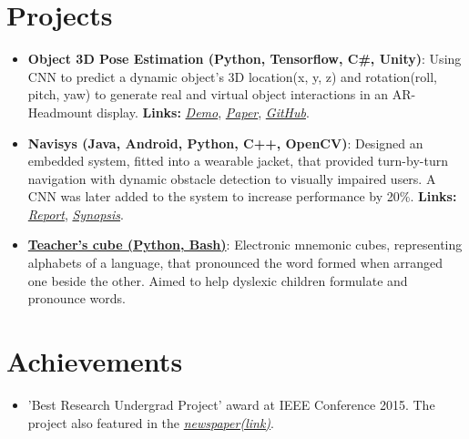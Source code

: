 \documentclass[letterpaper,11pt]{article}
\newcommand{\resumeItem}[2]{
  \linespread{1.2}
  \item\small{
      \textbf{#1}{: #2}
    }
}
\newcommand{\resumePoint}[1]{
  \linespread{1.2}
  \item\small{#1}
}
\newcommand{\resumeSubItem}[2]{\resumeItem{#1}{#2}\vspace{-4pt}}
\newcommand{\resumeSubHeadingListStart}{\begin{itemize}[leftmargin=*]}
\newcommand{\resumeSubHeadingListEnd}{\end{itemize}\vspace{-14pt}}
\begin{document}
%

\section{Projects}
  \resumeSubHeadingListStart
    \resumeSubItem{Object 3D Pose Estimation (Python, Tensorflow, C\#, Unity)}
      {Using CNN to predict a dynamic object\rq s 3D location(x, y, z) and rotation(roll, pitch, yaw) to generate real and virtual object interactions in an AR-Headmount display. \textbf{Links:}
      \href{https://drive.google.com/file/d/1kCepKQxR73tUTLuvmd1YL3sIbj1GxDdc/view?usp=sharing}{\textit{Demo}}, \href{https://drive.google.com/file/d/1mRwSJ8p2-g-gtBGl1A8seRB8SojWQphm/view?usp=sharing}{\textit{Paper}}, \href{https://github.com/nikhilsu/Object-location-detection}{\textit{GitHub}}.}
    \resumeSubItem{Navisys (Java, Android, Python, C++, OpenCV)}
      {Designed an embedded system, fitted into a wearable jacket, that provided turn-by-turn navigation with dynamic obstacle detection to visually impaired users. A CNN was later added to the system to increase performance by 20\%. \textbf{Links:}
      \href{https://drive.google.com/file/d/1bFHeZ7-7uwZ0spir3YQ7r0maWdLteEtu/view?usp=sharing}{\textit{Report}},
      \href{https://drive.google.com/file/d/1JWB67U2jjTG7cXZFVjRPVGKsv-rRhgUQ/view?usp=sharing}{\textit{Synopsis}}.}
    \resumeSubItem{\href{https://www.dropbox.com/s/grnct56cpmsiw6c/20160208_234825.mp4?dl=0}{Teacher\rq s cube (Python, Bash)}}
      {Electronic mnemonic cubes, representing alphabets of a language, that pronounced the word formed when arranged one beside the other. Aimed to help dyslexic children formulate and pronounce words.}
    \resumeSubHeadingListEnd

\vspace{5pt}
\section{Achievements}
\vspace{-5pt}
  \resumeSubHeadingListStart
    \resumePoint{'Best Research Undergrad Project' award at IEEE Conference 2015. The project also featured in the \href{https://drive.google.com/open?id=0B0vNhKZyi8qyam1fQ3lfaE1hMkE}{\emph{newspaper(link)}}.}
  \resumeSubHeadingListEnd
\end{document}
